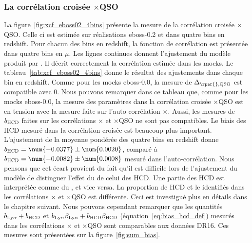 \subsubsection{La corrélation croisée \lya{}$\times$QSO}
La figure~\ref{fig:xcf_eboss02_4bins} présente la mesure de la corrélation croisée \lya{}$\times$QSO. Celle ci est estimée sur \Nmocks{} réalisations eboss-0.2 et dans quatre bins en redshift. Pour chacun des bins en redshift, la fonction de corrélation est présentée dans quatre bins en $\mu$.
Les lignes continues donnent l'ajustement du modèle produit par \picca{}. Il décrit correctement la corrélation estimée dans les mocks.
Le tableau~\ref{tab:xcf_eboss02_4bins} donne le résultat des ajustements dans chaque bin en redshift.
Comme pour les mocks eboss-0.0, la mesure de $\Delta_{\rpar{}, \textsc{QSO}}$ est compatible avec 0.
Nous pouvons remarquer dans ce tableau que, comme pour les mocks eboss-0.0, la mesure des paramètres \lya{} dans la corrélation croisée \lya{}$\times$QSO est en tension avec la mesure faite sur l'auto-corrélation \lya{}$\times$\lya{}.
  Aussi, les mesures de $b_{\textsc{HCD}}$ faites sur les corrélations \lya{}$\times$\lya{} et \lya{}$\times$QSO ne sont pas compatibles. Le biais des HCD mesuré dans la corrélation croisée est beaucoup plus important. L'ajustement de la moyenne pondérée des quatre bins en redshift donne $b_{\textsc{HCD}} = \num{-0.0377} \pm \num{0.0020}$, comparé à $b_{\textsc{HCD}} = \num{-0.0082} \pm \num{0.0008}$ mesuré dans l'auto-corrélation.
  Nous pensons que cet écart provient du fait qu'il est difficile lors de l'ajustement du modèle de distinguer l'effet du \lya{} de celui des HCD. Une partie des HCD est interprétée comme du \lya{}, et vice versa. La proportion de HCD et le \lya{} identifiés dans les corrélations \lya{}$\times$\lya{} et \lya{}$\times$QSO est différente. Ceci est investigué plus en détails dans le chapitre suivant.
  Nous pouvons cependant remarquer que les quantités $b_{\mathrm{Ly}\alpha} + b_{\textsc{HCD}}$ et $b_{\mathrm{Ly}\alpha}\beta_{\mathrm{Ly}\alpha} + b_{\textsc{HCD}}\beta_{\textsc{HCD}}$ (équation~\ref{eq:bias_hcd_def}) mesurés dans les corrélations \lya{}$\times$\lya{} et \lya{}$\times$QSO sont comparables aux données DR16. Ces mesures sont présentées sur la figure~\ref{fig:sum_bias}.



